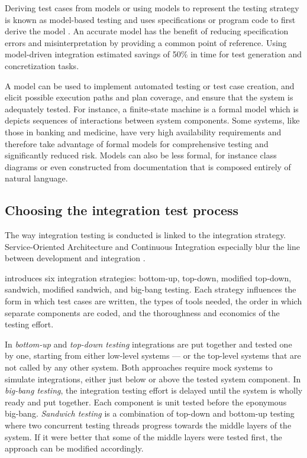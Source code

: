 \documentclass[12pt,a4paper,oneside,pdftex]{report}
\begin{document}
Deriving test cases from models or using models to represent the testing strategy is known as model-based testing and uses specifications or program code to first derive the model \citep{pezze2008software}. An accurate model has the benefit of reducing specification errors and misinterpretation by providing a common point of reference. Using model-driven integration \citet{wieczorek2010model} estimated savings of 50\% in time for test generation and concretization tasks.

A model can be used to implement automated testing or test case creation, and elicit possible execution paths and plan coverage, and ensure that the system is adequately tested. For instance, a finite-state machine is a formal model which is depicts sequences of interactions between system components. Some systems, like those in banking and medicine, have very high availability requirements and therefore take advantage of formal models for comprehensive testing and significantly reduced risk. Models can also be less formal, for instance class diagrams or even constructed from documentation that is composed entirely of natural language. \citep{pezze2008software}

\subsection{Choosing the integration test process}
The way integration testing is conducted is linked to the integration strategy. Service-Oriented Architecture and Continuous Integration especially blur the line between development and integration \citep{huang2008surrogate, wieczorek2010model}.

\citet{myers1976software} introduces six integration strategies: bottom-up, top-down, modified top-down, sandwich, modified sandwich, and big-bang testing. Each strategy influences the form in which test cases are written, the types of tools needed, the order in which separate components are coded, and the thoroughness and economics of the testing effort. 

In \emph{bottom-up} and \emph{top-down testing} integrations are put together and tested one by one, starting from either low-level systems --- or the top-level systems that are not called by any other system. Both approaches require mock systems to simulate integrations, either just below or above the tested system component. In \emph{big-bang testing}, the integration testing effort is delayed until the system is wholly ready and put together. Each component is unit tested before the eponymous big-bang. \emph{Sandwich testing} is a combination of top-down and bottom-up testing where two concurrent testing threads progress towards the middle layers of the system. If it were better that some of the middle layers were tested first, the approach can be modified accordingly. \citep{burnstein2003practical, myers1976software}
\end{document}

